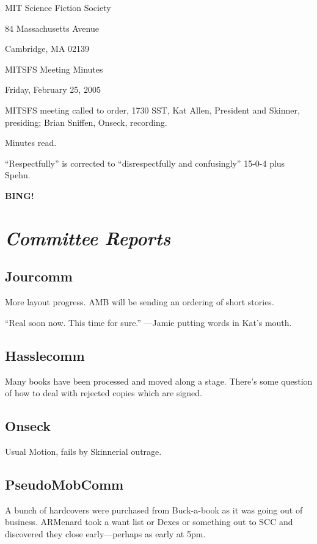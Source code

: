 \documentclass[10pt]{article}
\newcommand{\bing}{{\bf BING!} }
\newcommand{\goto}[1]{\bing \vskip 12pt \section*{{\em{#1}}}}
\newcommand{\ps}{ plus Spehn\xspace}
\begin{document}
\begin{center}

MIT Science Fiction Society

84 Massachusetts Avenue

Cambridge, MA 02139

\vspace{12pt}

MITSFS Meeting Minutes

Friday, February 25, 2005

\end{center}

\vspace{18pt}

\setlength{\parskip}{6pt}

\noindent
MITSFS meeting called to order, 1730 SST, Kat Allen, President and
Skinner, presiding; Brian Sniffen,  Onseck, recording.

Minutes read.

``Respectfully'' is corrected to ``disrespectfully and confusingly''
15-0-4\ps.

\goto{Committee Reports}
\subsection*{Jourcomm}

More layout progress.  AMB will be sending an ordering of short
stories.

``Real soon now.  This time for sure.'' ---Jamie putting words in
Kat's mouth.

\subsection*{Hasslecomm}
Many books have been processed and moved along a stage.  There's some
question of how to deal with rejected copies which are signed.

\subsection*{Onseck}
Usual Motion, fails by Skinnerial outrage.

\subsection*{PseudoMobComm}
A bunch of hardcovers were purchased from Buck-a-book as it was going
out of business.  ARMenard took a want list or Dexes or something out
to SCC and discovered they close early---perhaps as early at 5pm.
\end{document}
